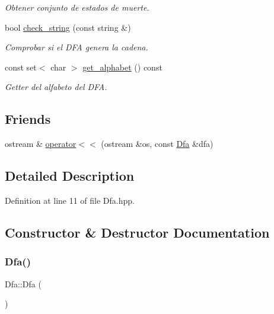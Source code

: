 \begin{DoxyCompactItemize}
\begin{DoxyCompactList}\small\item\em Obtener conjunto de estados de muerte. \end{DoxyCompactList}\item 
bool \hyperlink{class_dfa_a0dd99d06e33e16c8fd342af4dbba3551}{check\+\_\+string} (const string \&)
\begin{DoxyCompactList}\small\item\em Comprobar si el D\+FA genera la cadena. \end{DoxyCompactList}\item 
const set$<$ char $>$ \hyperlink{class_dfa_a4483dc3db82de29855237b13a63c42cd}{get\+\_\+alphabet} () const
\begin{DoxyCompactList}\small\item\em Getter del alfabeto del D\+FA. \end{DoxyCompactList}\end{DoxyCompactItemize}
\subsection*{Friends}
\begin{DoxyCompactItemize}
\item 
ostream \& \hyperlink{class_dfa_ae4bcdc6c0f5c2374f14902fd5e073c7d}{operator$<$$<$} (ostream \&os, const \hyperlink{class_dfa}{Dfa} \&dfa)
\end{DoxyCompactItemize}


\subsection{Detailed Description}


Definition at line 11 of file Dfa.\+hpp.



\subsection{Constructor \& Destructor Documentation}
\mbox{\label{class_dfa_a8b4306c41ff0004264f56563e4399992}} 
\subsubsection{\texorpdfstring{Dfa()}{Dfa()}}
{\footnotesize\ttfamily Dfa\+::\+Dfa (\begin{DoxyParamCaption}{ }\end{DoxyParamCaption})}



